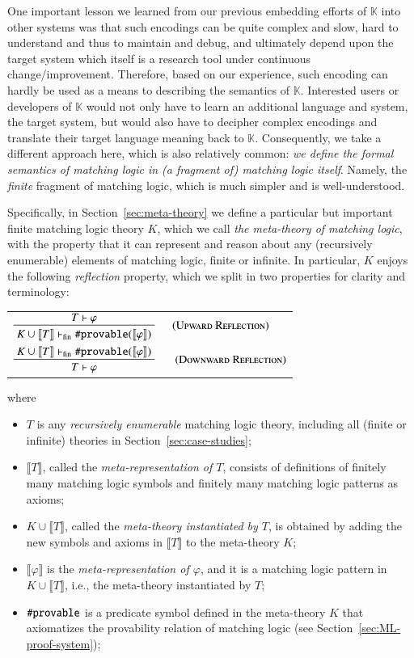 \documentclass[UTF8,11pt]{article}
\theoremstyle{plain}
\theoremstyle{definition}
\theoremstyle{remark}
\newcommand{\vdashfin}{\vdash_\text{fin}}
\newcommand{\K}{\mbox{$\mathbb{K}$}\xspace}
\newcommand{\denote}[1]{\llbracket{#1}\rrbracket}
\newcommand{\sharpsymbol}{\#}
\newcommand{\Kdeduce}{\textup{\texttt{\sharpsymbol provable}}}
\begin{document}
One important lesson we learned from our previous embedding efforts of \K
into other systems was that such encodings can be quite complex and slow,
hard to understand and thus to maintain and debug, and ultimately depend
upon the target system which itself is a research tool under continuous
change/improvement.
Therefore, based on our experience, such encoding can hardly
be used as a means to describing the semantics of \K.
Interested users or developers of \K would not only have to learn an
additional language and system, the target system, but would also have to
decipher complex encodings and translate their target language meaning back
to \K.
Consequently, we take a different approach here, which is also relatively
common:
\emph{we define the formal semantics of matching logic in (a fragment of)
matching logic itself}.
Namely, the \emph{finite} fragment of matching logic, which is much simpler
and is well-understood.

Specifically, in Section~\ref{sec:meta-theory} we define a particular but
important finite matching logic theory $K$, which we call
\emph{the meta-theory of matching logic}, with the property that it can
represent and reason about any (recursively enumerable) elements of
matching logic, finite or infinite.
In particular, $K$ enjoys the following \emph{reflection} property, which we
split in two properties for clarity and terminology:
\begin{center}
 \begin{tabular}{l}
  $
  \prftree[r]{\hspace*{3ex}\textsc{(Upward Reflection)}}
  {T \vdash \varphi}
  {K \cup \denote{T} \vdashfin \Kdeduce(\denote{\varphi})}
  $
  \\[4ex]
  $
  \prftree[r]{\hspace*{3ex} \textsc{(Downward Reflection)}}
  {K \cup \denote{T} \vdashfin \Kdeduce(\denote{\varphi})}
  {T \vdash \varphi}
  $
 \end{tabular}
\end{center}
where
\begin{itemize}
 \item $T$ is any \emph{recursively enumerable} matching logic theory,
 including all (finite or infinite) theories in
 Section~\ref{sec:case-studies};
 \item $\denote{T}$, called the \emph{meta-representation of $T$}, consists
 of definitions of finitely many matching logic symbols and finitely many
 matching logic patterns as axioms;
 \item $K \cup \denote{T}$, called the \emph{meta-theory instantiated by
 $T$}, is obtained by adding the new symbols and axioms in
 $\denote{T}$ to the meta-theory $K$;
 \item $\denote{\varphi}$ is the \emph{meta-representation of $\varphi$},
 and it is a matching logic pattern in $K \cup \denote{T}$, i.e., the
 meta-theory instantiated by $T$;
 \item $\Kdeduce$ is a predicate symbol defined in the meta-theory $K$ that
 axiomatizes the provability relation of matching logic (see
 Section~\ref{sec:ML-proof-system});
\end{itemize}
\end{document}
